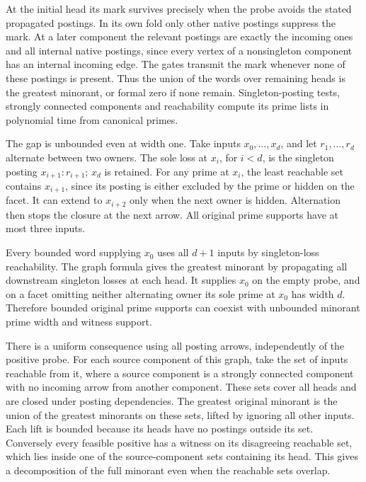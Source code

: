 At the initial head its mark survives precisely
when the probe avoids the stated propagated
postings. In its own fold only other native
postings suppress the mark. At a later component
the relevant postings are exactly the incoming
ones and all internal native postings, since
every vertex of a nonsingleton component has
an internal incoming edge. The gates transmit
the mark whenever none of these postings is
present. Thus the union of the words over
remaining heads is the greatest minorant, or
formal zero if none remain. Singleton-posting
tests, strongly connected components and
reachability compute its prime lists in
polynomial time from canonical primes.

The gap is unbounded even at width one. Take inputs
$x_0,\ldots,x_d$, and let $r_1,\ldots,r_d$ alternate
between two owners. The sole loss at $x_i$, for $i<d$,
is the singleton posting $x_{i+1}:r_{i+1}$; $x_d$ is
retained. For any prime at $x_i$, the least reachable
set contains $x_{i+1}$, since its posting is either
excluded by the prime or hidden on the facet. It can
extend to $x_{i+2}$ only when the next owner is hidden.
Alternation then stops the closure at the next arrow.
All original prime supports have at most three inputs.

Every bounded word supplying $x_0$ uses all $d+1$
inputs by singleton-loss reachability. The graph
formula gives the greatest minorant by propagating
all downstream singleton losses at each head. It
supplies $x_0$ on the empty probe, and on a facet
omitting neither alternating owner its sole prime
at $x_0$ has width $d$. Therefore
bounded original prime supports can coexist with
unbounded minorant prime width and witness support.

There is a uniform consequence using all posting
arrows, independently of the positive probe. For
each source component of this graph, take the set
of inputs reachable from it, where a source
component is a strongly connected component with
no incoming arrow from another component. These
sets cover all heads and are closed under posting
dependencies. The greatest original minorant is
the union of the greatest minorants on these
sets, lifted by ignoring all other inputs. Each
lift is bounded because its heads have no postings
outside its set. Conversely every feasible
positive has a witness on its disagreeing
reachable set, which lies inside one of the
source-component sets containing its head.
This gives a decomposition of the full minorant
even when the reachable sets overlap.

